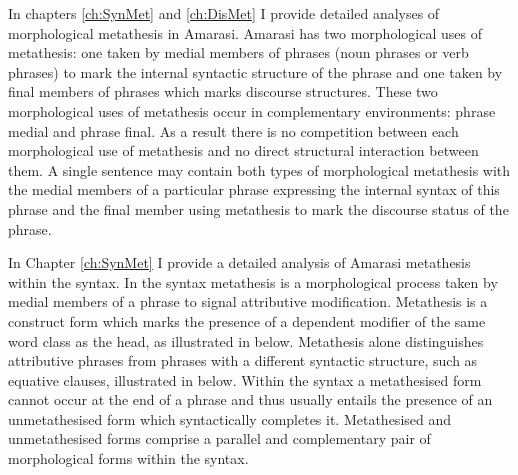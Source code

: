 In chapters \ref{ch:SynMet} and \ref{ch:DisMet}
I provide detailed analyses of morphological metathesis in Amarasi.
Amarasi has two morphological uses of metathesis:
one taken by medial members of phrases (noun phrases or verb phrases)
to mark the internal syntactic structure of the phrase
and one taken by final members of phrases
which marks discourse structures.
These two morphological uses of metathesis
occur in complementary environments:
phrase medial and phrase final.
As a result there is no competition
between each morphological use of metathesis
and no direct structural interaction between them.
A single sentence may contain both types of morphological
metathesis with the medial members of a particular
phrase expressing the internal syntax of this phrase
and the final member using metathesis to 
mark the discourse status of the phrase.

In Chapter \ref{ch:SynMet} I provide a detailed analysis of Amarasi metathesis within the syntax.
In the syntax metathesis is a morphological process
taken by medial members of a phrase to signal attributive modification.
Metathesis is a construct form which marks the presence of a dependent
modifier of the same word class as the head, as illustrated in  below.
Metathesis alone distinguishes attributive phrases from
phrases with a different syntactic structure, such as equative clauses,
illustrated in  below.
Within the syntax a metathesised form cannot occur at the end of a phrase
and thus usually entails the presence of an unmetathesised form which syntactically completes it.
Metathesised and unmetathesised forms comprise a parallel
and complementary pair of morphological forms within the syntax.

\begin{multicols}{2}
	\begin{exe}
		\label{ex:Fatu+Koqu}
	\end{exe}
\end{multicols}

